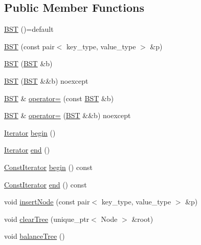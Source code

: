 \subsection*{Public Member Functions}
\begin{DoxyCompactItemize}
\item 
\mbox{\hyperlink{class_b_s_t_a7ec0e6b1d7f8cb8bbe036fd04fba06b3}{B\+ST}} ()=default
\item 
\mbox{\hyperlink{class_b_s_t_a2a4be89c2803166ad2bf6cb664684215}{B\+ST}} (const pair$<$ key\+\_\+type, value\+\_\+type $>$ \&p)
\item 
\mbox{\hyperlink{class_b_s_t_a1d7634883dab07eca63a324af612882c}{B\+ST}} (\mbox{\hyperlink{class_b_s_t}{B\+ST}} \&b)
\item 
\mbox{\hyperlink{class_b_s_t_af7174f9dd424af29c720587f4f3ff29b}{B\+ST}} (\mbox{\hyperlink{class_b_s_t}{B\+ST}} \&\&b) noexcept
\item 
\mbox{\hyperlink{class_b_s_t}{B\+ST}} \& \mbox{\hyperlink{class_b_s_t_a649df72e94b04a35975b0b3620777208}{operator=}} (const \mbox{\hyperlink{class_b_s_t}{B\+ST}} \&b)
\item 
\mbox{\hyperlink{class_b_s_t}{B\+ST}} \& \mbox{\hyperlink{class_b_s_t_aae5f751e3119d766ae7a8fc0781e68ba}{operator=}} (\mbox{\hyperlink{class_b_s_t}{B\+ST}} \&\&b) noexcept
\item 
\mbox{\hyperlink{class_b_s_t_1_1_iterator}{Iterator}} \mbox{\hyperlink{class_b_s_t_a1fa2e4ede1440f8c82a13cf650f5dea4}{begin}} ()
\item 
\mbox{\hyperlink{class_b_s_t_1_1_iterator}{Iterator}} \mbox{\hyperlink{class_b_s_t_a758f78a965cb2816f0502ff78b2fb542}{end}} ()
\item 
\mbox{\hyperlink{class_b_s_t_1_1_const_iterator}{Const\+Iterator}} \mbox{\hyperlink{class_b_s_t_a3c7bda7273cac1f486cc24c5d1198f38}{begin}} () const
\item 
\mbox{\hyperlink{class_b_s_t_1_1_const_iterator}{Const\+Iterator}} \mbox{\hyperlink{class_b_s_t_aacdfe4d003000ce143b43487fd509d61}{end}} () const
\item 
void \mbox{\hyperlink{class_b_s_t_a9d5f71106c279bd2f8effd06fa386667}{insert\+Node}} (const pair$<$ key\+\_\+type, value\+\_\+type $>$ \&p)
\item 
void \mbox{\hyperlink{class_b_s_t_a02200955e26dac5a2da745f7f9b73d0d}{clear\+Tree}} (unique\+\_\+ptr$<$ Node $>$ \&root)
\item 
void \mbox{\hyperlink{class_b_s_t_af8ffbeddf32425dba94b9ea1bc4b3ee7}{balance\+Tree}} ()
\item 

\end{DoxyCompactItemize}
